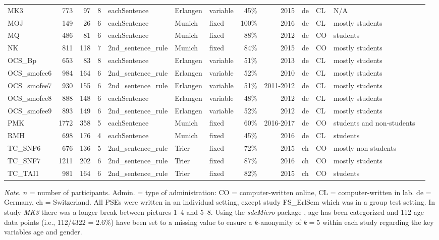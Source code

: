 \documentclass[man,a4paper,mask]{apa6}\usepackage[]{graphicx}\usepackage[]{color}
\begin{document}
\begin{table}
\begin{threeparttable}
\begin{tabularx}{\textwidth}{lrrrlllrrllll}
  MK3 & 773 &  97 &   8 & eachSentence & Erlangen & variable & 45\% & 2015 & de & CL & N/A \\ 
  MOJ & 149 &  26 &   6 & eachSentence & Munich & fixed & 100\% & 2016 & de & CL & mostly students \\ 
  MQ & 486 &  81 &   6 & eachSentence & Munich & fixed & 88\% & 2012 & de & CO & students \\ 
  NK & 811 & 118 &   7 & 2nd\_sentence\_rule & Munich & fixed & 84\% & 2015 & de & CO & mostly students \\ 
  OCS\_Bp & 653 &  83 &   8 & eachSentence & Erlangen & variable & 51\% & 2013 & de & CL & mostly students \\ 
  OCS\_smofee6 & 984 & 164 &   6 & 2nd\_sentence\_rule & Erlangen & variable & 52\% & 2010 & de & CL & mostly students \\ 
  OCS\_smofee7 & 930 & 155 &   6 & 2nd\_sentence\_rule & Erlangen & variable & 51\% & 2011-2012 & de & CL & mostly students \\ 
  OCS\_smofee8 & 888 & 148 &   6 & eachSentence & Erlangen & variable & 48\% & 2012 & de & CL & mostly students \\ 
  OCS\_smofee9 & 893 & 149 &   6 & 2nd\_sentence\_rule & Erlangen & variable & 52\% & 2012 & de & CL & mostly students \\ 
  PMK & 1772 & 358 &   5 & eachSentence & Munich & fixed & 60\% & 2016-2017 & de & CO & students and non-students \\ 
  RMH & 698 & 176 &   4 & eachSentence & Munich & fixed & 45\% & 2016 & de & CL & students \\ 
  TC\_SNF6 & 676 & 136 &   5 & 2nd\_sentence\_rule & Trier & fixed & 72\% & 2015 & ch & CO & mostly non-students \\ 
  TC\_SNF7 & 1211 & 202 &   6 & 2nd\_sentence\_rule & Trier & fixed & 87\% & 2016 & ch & CO & mostly students \\ 
  TC\_TAI1 & 981 & 164 &   6 & 2nd\_sentence\_rule & Trier & fixed & 82\% & 2015 & ch & CO & students \\ 
   \hline


		\bottomrule
		\end{tabularx}
		\begin{tablenotes}[para,flushleft]
			{\small
			\vspace*{0.75em}
			\textit{Note.} $n$ = number of participants. Admin. = type of administration: CO = computer-written online, CL = computer-written in lab. de = Germany, ch = Switzerland. All PSEs were written in an individual setting, except study FS\_ErlSem which was in a group test setting. In study \emph{MK3} there was a longer break between pictures 1--4 and 5--8. Using the \emph{sdcMicro} package \parencite{templ_StatisticalDisclosureControl_2015}, age has been categorized and 112 age data points (i.e., 112/4322 = 2.6\%) have been set to a missing value to ensure a $k$-anonymity of $k=5$ within each study regarding the key variables age and gender.}
    \end{tablenotes}
\end{threeparttable}
\end{table}
\end{document}

